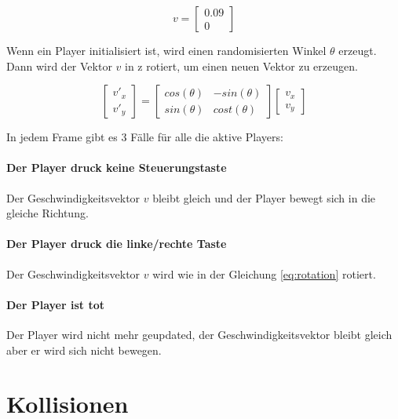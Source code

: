 \documentclass[doktyp=studarbeit]{TUBAFarbeiten}
\begin{document}
\begin{equation}
    v =
    \begin{bmatrix}
        0.09    \\
        0
    \end{bmatrix}
\end{equation}

Wenn ein Player initialisiert ist, wird einen randomisierten Winkel $\theta$ 
erzeugt. Dann wird der Vektor $v$ in z rotiert, um einen neuen Vektor zu 
erzeugen.

\begin{equation}
    \begin{bmatrix}
        v'_{x} \\
        v'_{y}     
    \end{bmatrix}
    =
    \begin{bmatrix}
        cos(\theta) & -sin(\theta) \\
        sin(\theta) & cost(\theta)
    \end{bmatrix}
    \begin{bmatrix}
        v_{x} \\
        v_{y}
    \end{bmatrix}
    \label{eq:rotation}
\end{equation}

In jedem Frame gibt es 3 Fälle für alle die aktive Players:

\paragraph{Der Player druck keine Steuerungstaste}
Der Geschwindigkeitsvektor $v$ bleibt gleich und der Player bewegt sich
in die gleiche Richtung.

\paragraph{Der Player druck die linke/rechte Taste}
Der Geschwindigkeitsvektor $v$ wird wie in der Gleichung \ref{eq:rotation}
rotiert.

\paragraph{Der Player ist tot}
Der Player wird nicht mehr geupdated, der Geschwindigkeitsvektor bleibt gleich
aber er wird sich nicht bewegen.

\section{Kollisionen}
\end{document}
